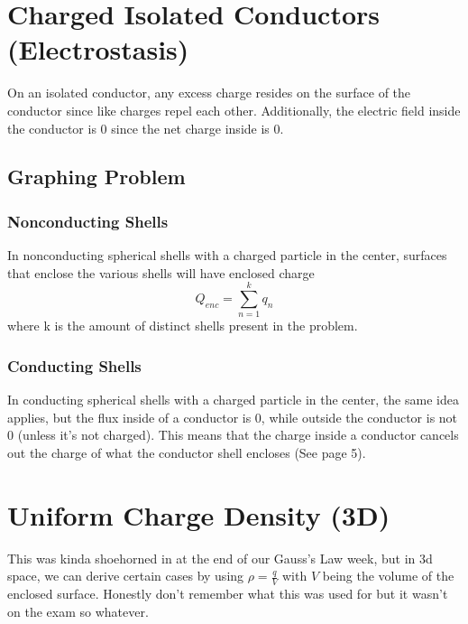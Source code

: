 \documentclass[]{article}
\begin{document}
\section{Charged Isolated Conductors (Electrostasis)}
On an isolated conductor, any excess charge resides on the surface of the conductor since like charges repel each other. Additionally, the electric field inside the conductor is 0 since the net charge inside is 0.
\subsection{Graphing Problem}
\subsubsection{Nonconducting Shells}
In nonconducting spherical shells with a charged particle in the center, surfaces that enclose the various shells will have enclosed charge 
\[ Q_{enc} = \sum_{n = 1}^{k} q_{n} \]
where k is the amount of distinct shells present in the problem.

\subsubsection{Conducting Shells}
In conducting spherical shells with a charged particle in the center, the same idea applies, but the flux inside of a conductor is 0, while outside the conductor is not 0 (unless it's not charged). This means that the charge inside a conductor cancels out the charge of what the conductor shell encloses (See page 5).

\section{Uniform Charge Density (3D)}
This was kinda shoehorned in at the end of our Gauss's Law week, but in 3d space, we can derive certain cases by using $ \rho = \frac{q}{V} $ with $ V $ being the volume of the enclosed surface. Honestly don't remember what this was used for but it wasn't on the exam so whatever.
\end{document}
